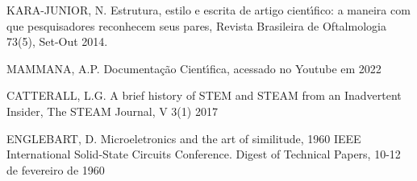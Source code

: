 \documentclass[
12pt,		%
openright,	%
twoside,  %
a4paper,			%
chapter=TITLE,		%
english,			%
french,				%
spanish,			%
brazil				%
]{USPSC-classe/USPSC}
\begin{document}
\begin{flushleft}
\begin{flushleft}
\begin{flushleft}
\begin{flushleft}
 KARA-JUNIOR, N. Estrutura, estilo e escrita de artigo cient\'{\i}fico: a maneira com que pesquisadores reconhecem seus pares, Revista Brasileira de Oftalmologia 73(5), Set-Out 2014.
\end{flushleft}


\end{flushleft}


\end{flushleft}


\end{flushleft}


\begin{flushleft}
\begin{flushleft}
\begin{flushleft}
\begin{flushleft}
[MAMMANA, 2019] MAMMANA, A.P. Documenta\c{c}\~ao Cient\'{\i}fica, acessado no Youtube em 2022
\end{flushleft}


\end{flushleft}


\end{flushleft}


\end{flushleft}


\begin{flushleft}
\begin{flushleft}
\begin{flushleft}
\begin{flushleft}
[CATTERALL, 2017] CATTERALL, L.G. A brief history of STEM and STEAM from an Inadvertent Insider, The STEAM Journal, V 3(1) 2017
\end{flushleft}


\end{flushleft}


\end{flushleft}


\end{flushleft}


\begin{flushleft}
\begin{flushleft}
\begin{flushleft}
\begin{flushleft}
[ENGLEBART, 2017] ENGLEBART, D. Microeletronics and the art of similitude, 1960 IEEE International Solid-State Circuits Conference. Digest of Technical Papers, 10-12 de fevereiro de 1960
\end{flushleft}


\end{flushleft}


\end{flushleft}


\end{flushleft}
\end{document}
